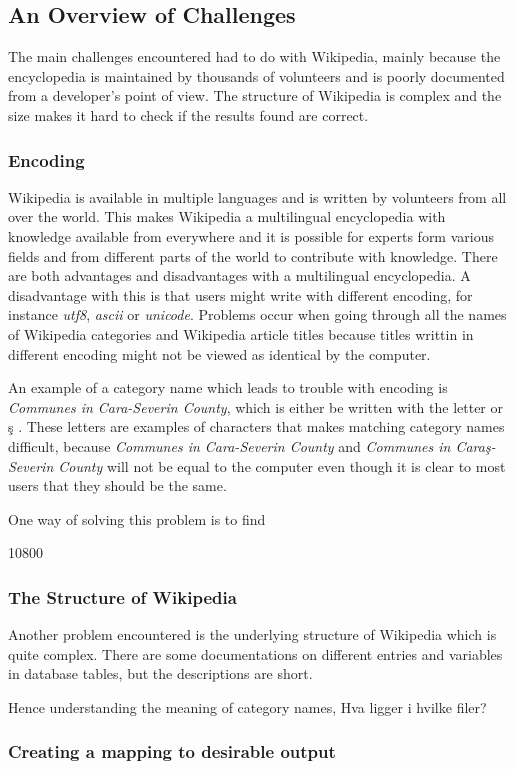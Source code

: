 \subsection{An Overview of Challenges}
The main challenges encountered had to do with Wikipedia, mainly because the encyclopedia is maintained by thousands of volunteers and is poorly documented from a developer's point of view. The structure of Wikipedia is complex and the size makes it hard to check if the results found are correct. 


\subsubsection{Encoding}
Wikipedia is available in multiple languages and is written by volunteers from all over the world. This makes Wikipedia a multilingual encyclopedia with knowledge available from everywhere and it is possible for experts form various fields and from different parts of the world to contribute with knowledge. There are both advantages and disadvantages with a multilingual encyclopedia. A disadvantage with this is that users might write with different encoding, for instance \emph{utf8}, \emph{ascii} or \emph{unicode}. Problems occur when going through all the names of Wikipedia categories and Wikipedia article titles because titles writtin in different encoding might not be viewed as identical by the computer. 

An example of a category name which leads to trouble with encoding is  \emph{Communes in Cara-Severin County}, which is either be written with the letter \emph{} \cite{swithcomma} or \c{s} \cite{swithcedilla}. These letters are examples of characters that makes matching category names difficult, because \emph{Communes in Cara-Severin County} and \emph{Communes in Cara\c{s}-Severin County} will not be equal to the computer even though it is clear to most users that they should be the same.



One way of solving this problem is to find

10800








\subsubsection{The Structure of Wikipedia}
Another problem encountered is the underlying structure of Wikipedia which is quite complex. There are some documentations on different entries and variables in database tables, but the descriptions are short. 

Hence understanding the meaning of category names, 
Hva ligger i hvilke filer?

\subsubsection{Creating a mapping to desirable output}
